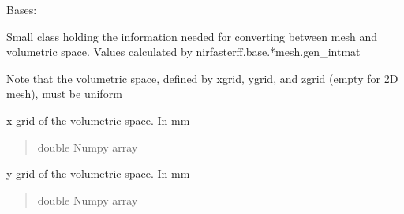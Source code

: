 \documentclass[letterpaper,10pt,english]{sphinxmanual}
\begin{document}
\begin{fulllineitems}
\label{\detokenize{_autosummary/nirfasterff.base.data.meshvol:nirfasterff.base.data.meshvol}}
\pysigstartsignatures
{}
\pysigstopsignatures
\sphinxAtStartPar
Bases: 

\sphinxAtStartPar
Small class holding the information needed for converting between mesh and volumetric space. Values calculated by nirfasterff.base.*mesh.gen\_intmat

\sphinxAtStartPar
Note that the volumetric space, defined by xgrid, ygrid, and zgrid (empty for 2D mesh), must be uniform

\begin{fulllineitems}
\label{\detokenize{_autosummary/nirfasterff.base.data.meshvol:nirfasterff.base.data.meshvol.xgrid}}
\pysigstartsignatures
{}
\pysigstopsignatures
\sphinxAtStartPar
x grid of the volumetric space. In mm
\begin{quote}\begin{description}
\sphinxAtStartPar
double Numpy array

\end{description}\end{quote}

\end{fulllineitems}


\begin{fulllineitems}
\label{\detokenize{_autosummary/nirfasterff.base.data.meshvol:nirfasterff.base.data.meshvol.ygrid}}
\pysigstartsignatures
{}
\pysigstopsignatures
\sphinxAtStartPar
y grid of the volumetric space. In mm
\begin{quote}\begin{description}
\sphinxAtStartPar
double Numpy array

\end{description}\end{quote}


\end{fulllineitems}
\end{fulllineitems}
\end{document}
